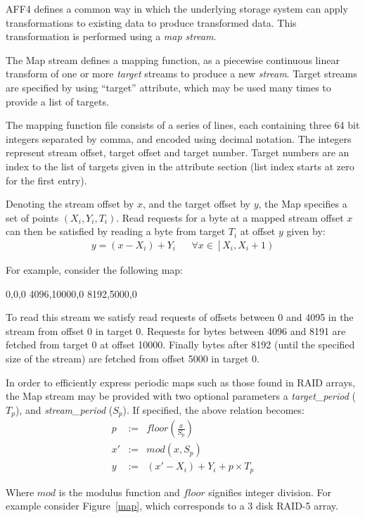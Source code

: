 \documentclass[10pt, conference]{IEEEtran}
\begin{document}
AFF4 defines a common way in
which the underlying storage system can apply transformations to
existing data to produce transformed data. This transformation is
performed using a \emph{map stream}.

The Map stream defines a mapping function, as a piecewise continuous
linear transform of one or more {\em target} streams to produce a new
{\em stream}. Target streams are specified by using ``target''
attribute, which may be used many times to provide a list of targets.

The mapping function file consists of a series of lines, each
containing three 64 bit integers separated by comma, and encoded using
decimal notation. The integers represent stream offset, target offset
and target number. Target numbers are an index to the list of targets
given in the attribute section (list index starts at zero for the
first entry).

Denoting the stream offset by $x$, and the target offset by $y$, the
Map specifies a set of points $(X_i,Y_i,T_i)$. Read requests for a
byte at a mapped stream offset $x$ can then be satisfied by reading a
byte from target $T_i$ at offset $y$ given by:
\begin{eqnarray}
y = (x - X_i) + Y_i & &
\forall x \in \left [X_i, X_i+1 \right )
\end{eqnarray}

For example, consider the following map:
\begin{verbatim*}
0,0,0
4096,10000,0
8192,5000,0
\end{verbatim*}

To read this stream we satisfy read requests of offsets between 0 and
4095 in the stream from offset 0 in target 0. Requests for bytes
between 4096 and 8191 are fetched from target 0 at offset
10000. Finally bytes after 8192 (until the specified size of the
stream) are fetched from offset 5000 in target 0.

In order to efficiently express periodic maps such as those found in
RAID arrays, the Map stream may be provided with two optional
parameters a {\em target\_period} ($T_p$), and {\em stream\_period}
($S_p$). If specified, the above relation becomes:
\begin{eqnarray*}
p &:=& floor\left (\frac{x}{S_p} \right) \\
x' &:=& mod(x ,S_p)  \\   \label{eq:no1}
y &:=& (x'-X_i) + Y_i + p \times T_p
\end{eqnarray*}

Where $mod$ is the modulus function and $floor$ signifies integer
division. For example consider Figure~\ref{map}, which corresponds to a 3
disk RAID-5 array.
\end{document}
